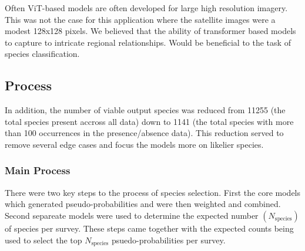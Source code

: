 Often ViT-based models are often developed for large high resolution imagery. This was not the case for this application where the satellite images were a modest 128x128 pixels. We believed that the ability of transformer based models to capture to intricate regional relationships. Would be beneficial to the task of species classification.

\subsection{Process}





In addition, the number of viable output species was reduced from 11255 (the total species present accross all data) down to 1141 (the total species with more than 100 occurrences in the presence/absence data). 
This reduction served to remove several edge cases and focus the models more on likelier species.




\subsubsection{Main Process}
\newcommand{\nspecies}{N_{\text{species}}}

There were two key steps to the process of species selection. First the core models which generated pseudo-probabilities and were then weighted and combined.
Second separeate models were used to determine the expected number $(\nspecies)$ of species per survey.
These steps came together with the expected counts being used to select the top  $\nspecies$ psuedo-probabilities per survey.

%         
%         

